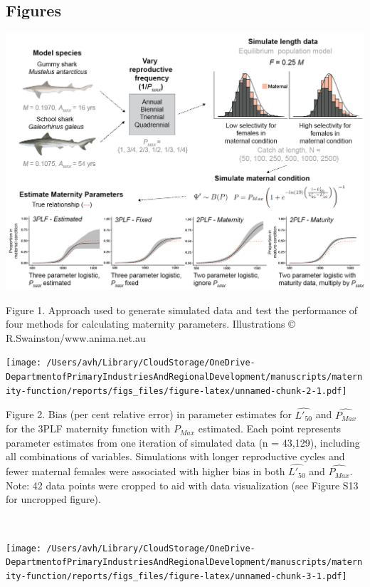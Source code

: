 \documentclass[
]{article}
\author{}
\date{\vspace{-2.5em}}
\begin{document}
\subsection{Figures}\label{figures}

\includegraphics[width=1\linewidth]{../img/figure1}

Figure 1. Approach used to generate simulated data and test the
performance of four methods for calculating maternity parameters.
Illustrations © R.Swainston/www.anima.net.au

\texttt{[image: /Users/avh/Library/CloudStorage/OneDrive-DepartmentofPrimaryIndustriesAndRegionalDevelopment/manuscripts/maternity-function/reports/figs\_files/figure-latex/unnamed-chunk-2-1.pdf]}

Figure 2. Bias (per cent relative error) in parameter estimates for
\(\hat{L'_{50}}\) and \(\hat{P_{Max}}\) for the 3PLF maternity function
with \(P_{Max}\) estimated. Each point represents parameter estimates
from one iteration of simulated data (n = 43,129), including all
combinations of variables. Simulations with longer reproductive cycles
and fewer maternal females were associated with higher bias in both
\(\hat{L'_{50}}\) and \(\hat{P_{Max}}\). Note: 42 data points were
cropped to aid with data visualization (see Figure S13 for uncropped
figure).\\
\strut \\
\newpage

\texttt{[image: /Users/avh/Library/CloudStorage/OneDrive-DepartmentofPrimaryIndustriesAndRegionalDevelopment/manuscripts/maternity-function/reports/figs\_files/figure-latex/unnamed-chunk-3-1.pdf]}
\end{document}

